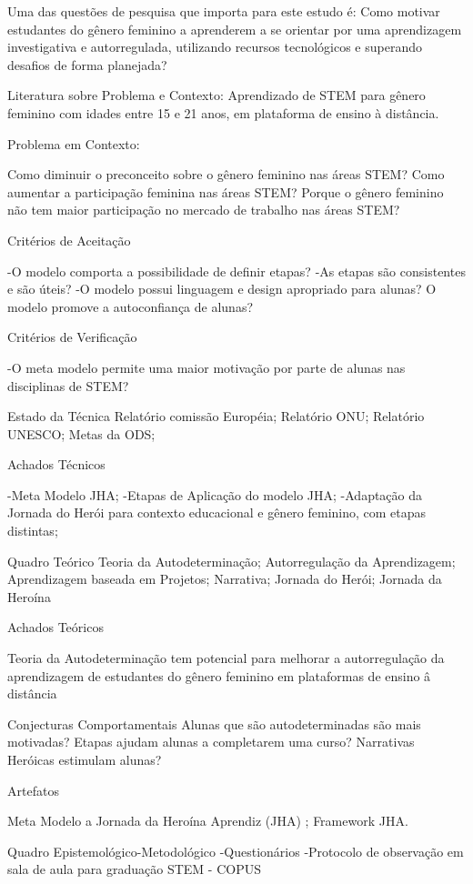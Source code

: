 Uma das questões de pesquisa que importa para este estudo é: Como motivar estudantes do gênero feminino a aprenderem a se orientar por uma aprendizagem investigativa e autorregulada, utilizando recursos tecnológicos e superando desafios de forma planejada?

Literatura sobre Problema e Contexto:
Aprendizado de STEM para gênero feminino com idades entre 15 e 21 anos, em plataforma de ensino à distância.

Problema em Contexto:

Como diminuir o preconceito sobre o gênero feminino nas áreas STEM?
Como aumentar a participação feminina nas áreas STEM?
Porque o gênero feminino não tem maior participação no mercado de trabalho nas áreas STEM?

Critérios de Aceitação

-O modelo comporta a possibilidade de definir etapas?
-As etapas são consistentes e são úteis?
-O modelo possui linguagem e design apropriado para alunas? 
O modelo promove a autoconfiança de alunas?

Critérios de Verificação

-O meta modelo permite uma maior motivação por parte de alunas nas disciplinas de STEM?

Estado da Técnica
Relatório comissão Européia;
Relatório ONU;
Relatório UNESCO; 
Metas da ODS;

Achados Técnicos

-Meta Modelo JHA;
-Etapas de Aplicação do modelo JHA;
-Adaptação da Jornada do Herói para contexto educacional e gênero feminino, com etapas distintas;


Quadro Teórico
Teoria da Autodeterminação;
Autorregulação da Aprendizagem;
Aprendizagem baseada em Projetos;
Narrativa;
Jornada do Herói;
Jornada da Heroína

Achados Teóricos

Teoria da Autodeterminação tem potencial para melhorar a autorregulação da aprendizagem de estudantes do gênero feminino em plataformas de ensino â distância

Conjecturas Comportamentais
 Alunas que são autodeterminadas são mais motivadas?
Etapas ajudam alunas a completarem uma curso?
Narrativas Heróicas estimulam alunas?  

Artefatos 

Meta Modelo a Jornada da Heroína Aprendiz (JHA) ;
Framework JHA.

Quadro Epistemológico-Metodológico
-Questionários
-Protocolo de observação em sala de aula para graduação STEM - COPUS

